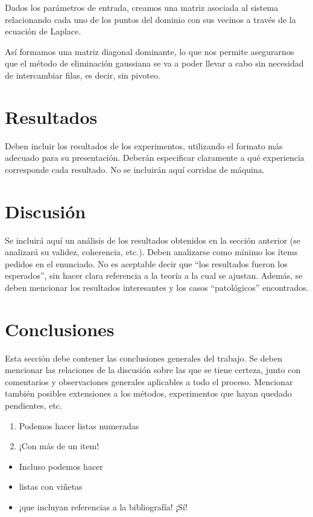 \documentclass[11pt, a4paper, spanish]{article}
\begin{document}
  Dados los parámetros de entrada, creamos una matriz asociada al sistema relacionando cada uno de los puntos del dominio con sus vecinos a través de la ecuación de Laplace.

  Así formamos una matriz diagonal dominante, lo que nos permite asegurarnos que el método de eliminación gaussiana se va a poder llevar a cabo sin necesidad de intercambiar filas, es decir, sin pivoteo.

\section{Resultados}

  Deben incluir los resultados de los experimentos, utilizando el formato más adecuado para su presentación. Deberán especificar claramente a qué experiencia corresponde cada resultado. No se incluirán aquí corridas de máquina.

\section{Discusión}

  Se incluirá aquí un análisis de los resultados obtenidos en la sección anterior (se analizará su validez, coherencia, etc.). Deben analizarse como mínimo los ítems pedidos en el enunciado. No es aceptable decir que ``los resultados fueron los esperados'', sin hacer clara referencia a la teoría a la cual se ajustan. Además, se deben mencionar los resultados interesantes y los casos ``patológicos'' encontrados.

\section{Conclusiones}

  Esta sección debe contener las conclusiones generales del trabajo. Se deben mencionar las relaciones de la discusión sobre las que se tiene certeza, junto con comentarios y observaciones generales aplicables a todo el proceso. Mencionar también posibles extensiones a los métodos, experimentos que hayan quedado pendientes, etc.

  \begin{enumerate}
    \item Podemos hacer listas numeradas
    \item ¡Con más de un item!
  \end{enumerate}

  \begin{itemize}
    \item Incluso podemos hacer
    \item listas con viñetas
    \item ¡que incluyan referencias a la bibliografía! ¡Sí! \cite{nosPodemosCopiarSiLoCitamos}
  \end{itemize}
\end{document}
